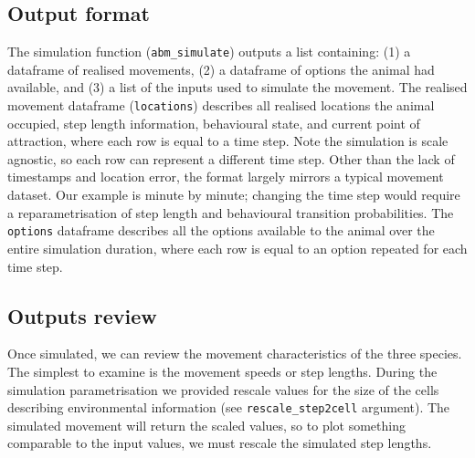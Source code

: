 \documentclass[10pt,a4paper]{article}
\begin{document}
\hypertarget{output-format}{%
\subsection{Output format}\label{output-format}}

The simulation function (\texttt{abm\_simulate}) outputs a list containing: (1) a dataframe of realised movements, (2) a dataframe of options the animal had available, and (3) a list of the inputs used to simulate the movement.
The realised movement dataframe (\texttt{locations}) describes all realised locations the animal occupied, step length information, behavioural state, and current point of attraction, where each row is equal to a time step.
Note the simulation is scale agnostic, so each row can represent a different time step.
Other than the lack of timestamps and location error, the format largely mirrors a typical movement dataset.
Our example is minute by minute; changing the time step would require a reparametrisation of step length and behavioural transition probabilities.
The \texttt{options} dataframe describes all the options available to the animal over the entire simulation duration, where each row is equal to an option repeated for each time step.

\hypertarget{outputs-review}{%
\subsection{Outputs review}\label{outputs-review}}

Once simulated, we can review the movement characteristics of the three species.
The simplest to examine is the movement speeds or step lengths.
During the simulation parametrisation we provided rescale values for the size of the cells describing environmental information (see \texttt{rescale\_step2cell} argument).
The simulated movement will return the scaled values, so to plot something comparable to the input values, we must rescale the simulated step lengths.
\end{document}
